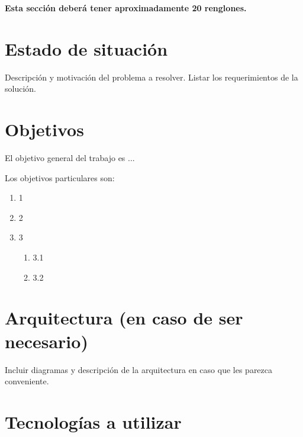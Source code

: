 \documentclass[12pt]{article}
\begin{document}
{\bf Esta sección deberá tener aproximadamente  20 renglones.}


\section{Estado de situación}

Descripción y motivación del problema a resolver. Listar los requerimientos de la solución.

\bigskip


\section{Objetivos}

El objetivo general del trabajo es ...

Los objetivos particulares son:

\begin{enumerate}
    \item 1
    \item 2
    \item 3
    \begin{enumerate}
        \item 3.1
        \item 3.2
    \end{enumerate}
\end{enumerate}

\bigskip


\section{Arquitectura (en caso de ser necesario)}

Incluir diagramas y descripción de la arquitectura en caso que les parezca conveniente.

\bigskip


\section{Tecnologías a utilizar}
\end{document}
